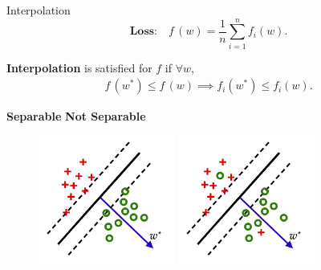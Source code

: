 \documentclass[notheorems]{beamer}
\def\\{}%
\begin{document}
    \begin{frame}{Interpolation}
        \[ \textbf{Loss:} \quad f \,(w) = \frac{1}{n}\sum_{i=1}^n f_i(w). \]

        \textbf{Interpolation} is satisfied for \( f \) if $\forall w$,
        \begin{align*}
            f\,(w^*) \leq f\,(w) \implies f_i(w^*) \leq f_i(w).\\
        \end{align*}

        {\hspace{0.125\textwidth} \large{\textbf{Separable} \hspace{0.3\textwidth} \textbf{Not Separable}}}
        \begin{figure}
            \centering
            \includegraphics[width=0.4\textwidth]{figures/separable_2}
            \hspace{0.1\textwidth}
            \includegraphics[width=0.4\textwidth]{figures/not_separable_2}
        \end{figure}

    \end{frame}
\end{document}

